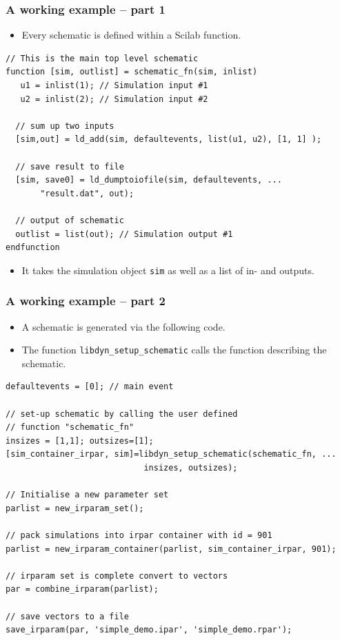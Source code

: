 \documentclass[serif,9pt,xcolor=dvipsnames]{beamer}
\begin{document}
\begin{frame}[fragile]
  \frametitle{A working example -- part 1}

\begin{itemize}
 \item Every schematic is defined within a Scilab function.
\end{itemize}


{\small 
\begin{lstlisting} 
// This is the main top level schematic
function [sim, outlist] = schematic_fn(sim, inlist)
   u1 = inlist(1); // Simulation input #1
   u2 = inlist(2); // Simulation input #2
   
  // sum up two inputs
  [sim,out] = ld_add(sim, defaultevents, list(u1, u2), [1, 1] );
  
  // save result to file
  [sim, save0] = ld_dumptoiofile(sim, defaultevents, ...
       "result.dat", out);
  
  // output of schematic
  outlist = list(out); // Simulation output #1
endfunction
\end{lstlisting}}

\begin{itemize}
 \item It takes the simulation object \texttt{sim} as well as a list of in- and  outputs.
\end{itemize}


\end{frame}


\begin{frame}[fragile]
  \frametitle{A working example -- part 2}

\begin{itemize}
 \item A schematic is generated via the following code. 
 \item The function \texttt{libdyn\_setup\_schematic} calls the function describing the schematic.
\end{itemize}


{\small 
\begin{lstlisting} 
defaultevents = [0]; // main event

// set-up schematic by calling the user defined
// function "schematic_fn"
insizes = [1,1]; outsizes=[1];
[sim_container_irpar, sim]=libdyn_setup_schematic(schematic_fn, ...
                            insizes, outsizes);

// Initialise a new parameter set
parlist = new_irparam_set();

// pack simulations into irpar container with id = 901
parlist = new_irparam_container(parlist, sim_container_irpar, 901);

// irparam set is complete convert to vectors
par = combine_irparam(parlist);

// save vectors to a file
save_irparam(par, 'simple_demo.ipar', 'simple_demo.rpar');
\end{lstlisting}}

\end{frame}
\end{document}
